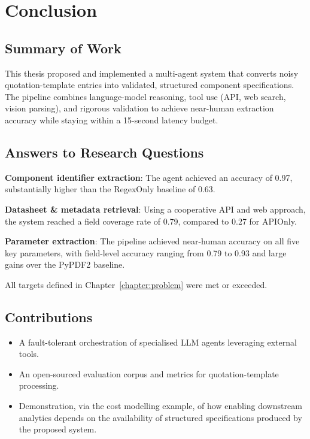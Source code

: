 \chapter{Conclusion}
\label{chapter:conclusion}

\section{Summary of Work}
This thesis proposed and implemented a multi-agent system that converts noisy quotation-template entries into validated, structured component specifications.  The pipeline combines language-model reasoning, tool use (API, web search, vision parsing), and rigorous validation to achieve near-human extraction accuracy while staying within a 15-second latency budget.

\section{Answers to Research Questions}

\textbf{Component identifier extraction}: The agent achieved an accuracy of 0.97, substantially higher than the RegexOnly baseline of 0.63.

\textbf{Datasheet \& metadata retrieval}: Using a cooperative API and web approach, the system reached a field coverage rate of 0.79, compared to 0.27 for APIOnly.

\textbf{Parameter extraction}: The pipeline achieved near-human accuracy on all five key parameters, with field-level accuracy ranging from 0.79 to 0.93 and large gains over the PyPDF2 baseline.

All targets defined in Chapter~\ref{chapter:problem} were met or exceeded.

\section{Contributions}
\begin{itemize}
  \item A fault-tolerant orchestration of specialised LLM agents leveraging external tools.
  \item An open-sourced evaluation corpus and metrics for quotation-template processing.
  \item Demonstration, via the cost modelling example, of how enabling downstream analytics depends on the availability of structured specifications produced by the proposed system.
\end{itemize}

